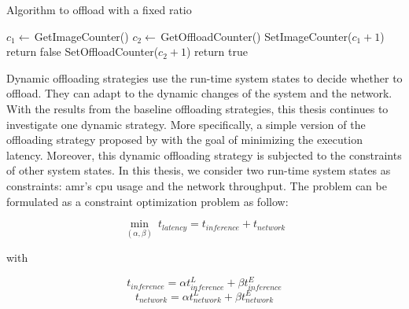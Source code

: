 \begin{algorithm}[htp]
\caption{Algorithm to offload with a fixed ratio}\label{alg:ratio_strategy}
\begin{algorithmic}[1]
     
        \State $c_1 \gets \, $GetImageCounter()
        \State $c_2 \gets \, $GetOffloadCounter()
        \State SetImageCounter($c_1 + 1$) 
            \State return false 
        \Else
            \State SetOffloadCounter($c_2 + 1$)
            \State return true 
        \EndIf
    \EndFunction
\end{algorithmic}
\end{algorithm}

Dynamic offloading strategies use the run-time system states to decide whether to offload. They can adapt to the dynamic changes of the system and the network. With the results from the baseline offloading strategies, this thesis continues to investigate one dynamic strategy. More specifically, a simple version of the offloading strategy proposed by \citeauthor*{Ning2019} \cite{Ning2019} with the goal of minimizing the execution latency. Moreover, this dynamic offloading strategy is subjected to the constraints of other system states. In this thesis, we consider two run-time system states as constraints: \gls{amr}'s \gls{cpu} usage and the network throughput. The problem can be formulated as a constraint optimization problem as follow:

\begin{equation}
    \min_{(\alpha, \beta)} \: t_{latency} = t_{inference} + t_{network}
\end{equation}

with

\begin{equation*}
    t_{inference} = \alpha t_{inference}^{L} + \beta t_{inference}^{E}
\end{equation*}
\begin{equation*}
    t_{network} = \alpha t_{network}^{L} + \beta t_{network}^{E}
\end{equation*}

